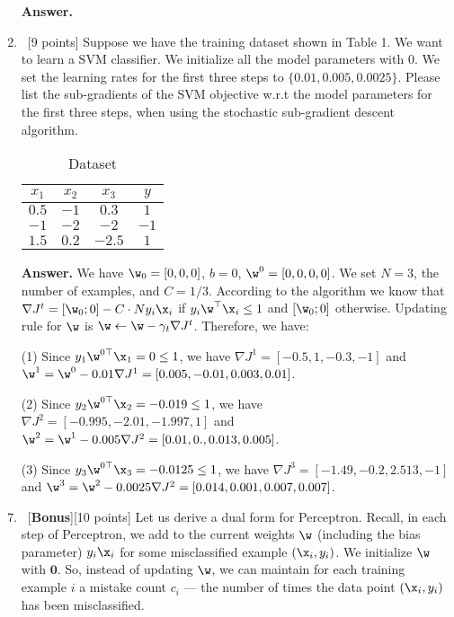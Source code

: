 \documentclass[12pt, fullpage,letterpaper]{article}
\begin{document}
\begin{enumerate}
\item[{\bf Answer.}]

	\item~[9 points] Suppose we have the training dataset shown in Table 1. We want to learn a SVM classifier. We initialize all the model parameters with $0$. We set the learning rates for the first three steps to $\{0.01, 0.005, 0.0025\}$.  Please list the sub-gradients of the SVM objective w.r.t the model parameters for the first three steps, when using the stochastic sub-gradient descent algorithm. 
	\begin{table}[h]
		\centering
		\begin{tabular}{ccc|c}
			$x_1$ & $x_2$ & $x_3$ &  $y$\\ 
			\hline\hline
			$0.5$ & $-1$ & $0.3$ & $1$ \\ \hline
			$-1$ & $-2$ & $-2$ & $-1$\\ \hline
			$1.5$ & $0.2$ & $-2.5$ & $1$\\ \hline
		\end{tabular}
	\caption{Dataset}
	\end{table}

\item[{\bf Answer.}]
We have $\w_0 = [0, 0, 0]$, $b = 0$, $\w^0 = [0, 0, 0, 0]$. We set $N=3$, the number of examples, and $C = 1/3$. According to the algorithm we know that $\nabla J^t = [\w_0;0] - C\cdot N y_i\x_i$ if $y_i\w^\top \x_i \leq 1$ and $ [\w_0;0] $ otherwise. Updating rule for $\w$ is $\w \leftarrow \w - \gamma_t \nabla J^t$. Therefore, we have: 

\item[(1)] Since $y_1\w^{0\top} \x_1 = 0 \leq 1$, we have $\nabla J^1 = [-0.5, 1, -0.3, -1 ]$ and $\w^1 = \w^0 - 0.01 \nabla J^1 = [ 0.005, -0.01,  0.003,  0.01 ]$. 

\item[(2)] Since $y_2\w^{0\top} \x_2 = -0.019 \leq 1$, we have $\nabla J^2 = [-0.995, -2.01 , -1.997,  1]$ and $\w^2 = \w^1 - 0.005 \nabla J^2 = [ 0.01 ,  0.   ,  0.013,  0.005]$.

\item[(3)] Since $y_3\w^{0\top} \x_3 = -0.0125 \leq 1$, we have $\nabla J^3 = [-1.49 , -0.2  ,  2.513, -1]$ and $\w^3 =  \w^2 - 0.0025 \nabla J^2 =  [ 0.014,  0.001,  0.007,  0.007]$. 


	\item~[\textbf{Bonus}][10 points] Let us derive a dual form for Perceptron. Recall, in each step of Perceptron, we add to the current weights $\w$ (including the bias parameter) $y_i\x_i$ for some misclassified example $(\x_i, y_i)$. We initialize $\w$ with $\mathbf{0}$. So, instead of updating $\w$, we can maintain for each training example $i$ a mistake count $c_i$ --- the number of times the data point $(\x_i, y_i)$ has been misclassified. 
	

\end{enumerate}
\end{document}
